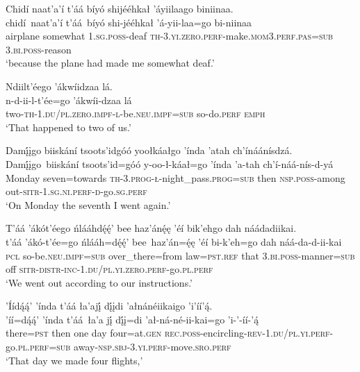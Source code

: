 \ea\label{ex:text9-7-2}
Chidí naat’a’í t’áá bíyó shijééhkał ’áyiilaago biniinaa.\\
\gll chidí~{naat’a’í}	t’áá~{bíyó}	shi-jééhkał	’á-yii-laa=go	bi-niinaa\\
     airplane	somewhat	1.\textsc{sg}.\textsc{poss}-deaf	\textsc{th}-3.\textsc{yi}.\textsc{zero}.\textsc{perf}-make.\textsc{mom}3.\textsc{perf}.\textsc{pas}=\textsc{sub}	3.\textsc{bi}.\textsc{poss}-reason\\
\glt `because the plane had made me somewhat deaf.'
\z

\ea\label{ex:text9-7-3}
Ndiilt’éego ’ákwíidzaa lá.\\
\gll n-d-ii-l-t’ée=go	’ákwíi-dzaa	lá\\
     two-\textsc{th}-1.\textsc{du}/\textsc{pl}.\textsc{zero}.\textsc{impf}-\textsc{l}-be.\textsc{neu}.\textsc{impf}=\textsc{sub}	so-do.\textsc{perf}	\textsc{emph}\\
\glt `That happened to two of us.'
\z

\ea\label{ex:text9-8-1}
Damį́įgo biiskání tsoots’idgóó yoołkáałgo ’índa ’atah ch’ínáánísdzá.\\
\gll Damį́įgo~{biiskání}	tsoots’id=góó	y-oo-ł-káał=go	’índa	’a-tah	ch’í-náá-nís-d-yá\\
     Monday	seven=towards	\textsc{th}-3.\textsc{prog}-\textsc{ł}-night\_pass.\textsc{prog}=\textsc{sub}	then	\textsc{nsp}.\textsc{poss}-among	out-\textsc{sitr}-1.\textsc{sg}.\textsc{ni}.\textsc{perf}-\textsc{d}-go.\textsc{sg}.\textsc{perf}\\
\glt `On Monday the seventh I went again.'
\z

\ea\label{ex:text9-8-2}
T’áá ’ákót’éego ńlááhdę́ę́’ bee haz’ánę́ę ’éí bik’ehgo dah náádadiikai.\\
\gll t’áá	’ákó-t’ée=go	ńlááh=dę́ę́’	bee~{haz’án=ę́ę}	’éí	bi-k’eh=go	dah	náá-da-d-ii-kai\\
     \textsc{pcl}	so-be.\textsc{neu}.\textsc{impf}=\textsc{sub}	over\_there=from	law=\textsc{pst}.\textsc{ref}	that	3.\textsc{bi}.\textsc{poss}-manner=\textsc{sub}	off	\textsc{sitr}-\textsc{distr}-\textsc{inc}-1.\textsc{du}/\textsc{pl}.\textsc{yi}.\textsc{zero}.\textsc{perf}-go.\textsc{pl}.\textsc{perf}\\
\glt `We went out according to our instructions.'
\z

\ea\label{ex:text9-8-3}
’Íídą́ą́’ ’índa t’áá ła’ajį́ dį́įdi ’ałnánéiikaigo ’i’íí’ą́.\\
\gll ’íí=dą́ą́’	’índa	t’áá~{ła’a} jį́	dį́į=di	’ał-ná-né-ii-kai=go	’i-’-íí-’ą́\\
     there=\textsc{pst}	then	one day	four=at.\textsc{gen}	\textsc{rec}.\textsc{poss}-encircling-\textsc{rev}-1.\textsc{du}/\textsc{pl}.\textsc{yi}.\textsc{perf}-go.\textsc{pl}.\textsc{perf}=\textsc{sub}	away-\textsc{nsp}.\textsc{sbj}-3.\textsc{yi}.\textsc{perf}-move.\textsc{sro}.\textsc{perf}\\
\glt `That day we made four flights,'
\z

